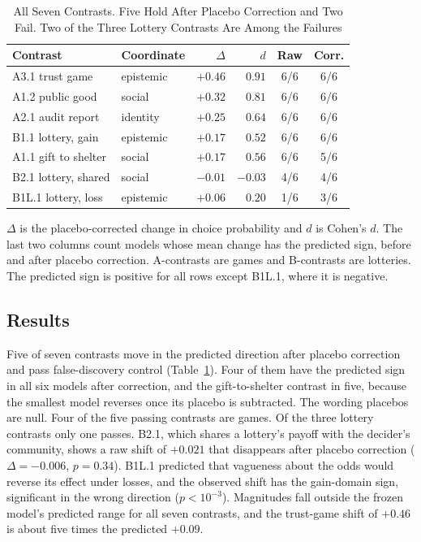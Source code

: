 \documentclass[journal]{IEEEtran}
\begin{document}
\begin{table}[!t]
\renewcommand{\arraystretch}{1.15}
\caption{All Seven Contrasts. Five Hold After Placebo Correction and Two Fail. Two of the Three Lottery Contrasts Are Among the Failures}
\label{tab:projgap}
\centering
\footnotesize
\begin{tabular}{@{}l l r r c c@{}}
\toprule
\textbf{Contrast} & \textbf{Coordinate} & \textbf{$\Delta$} & \textbf{$d$} & \textbf{Raw} & \textbf{Corr.} \\
\midrule
A3.1 trust game     & epistemic & $+0.46$ & $0.91$ & 6/6 & 6/6 \\
A1.2 public good    & social    & $+0.32$ & $0.81$ & 6/6 & 6/6 \\
A2.1 audit report   & identity  & $+0.25$ & $0.64$ & 6/6 & 6/6 \\
B1.1 lottery, gain  & epistemic & $+0.17$ & $0.52$ & 6/6 & 6/6 \\
A1.1 gift to shelter & social   & $+0.17$ & $0.56$ & 6/6 & 5/6 \\
\midrule
B2.1 lottery, shared & social   & $-0.01$ & $-0.03$ & 4/6 & 4/6 \\
B1L.1 lottery, loss & epistemic & $+0.06$ & $0.20$ & 1/6 & 3/6 \\
\bottomrule
\end{tabular}
\begin{flushleft}
\footnotesize{$\Delta$ is the placebo-corrected change in choice probability and $d$ is Cohen's $d$. The last two columns count models whose mean change has the predicted sign, before and after placebo correction. A-contrasts are games and B-contrasts are lotteries. The predicted sign is positive for all rows except B1L.1, where it is negative.}
\end{flushleft}
\end{table}

\subsection{Results}
Five of seven contrasts move in the predicted direction after placebo correction and pass false-discovery control (Table~\ref{tab:projgap}).
Four of them have the predicted sign in all six models after correction, and the gift-to-shelter contrast in five, because the smallest model reverses once its placebo is subtracted.
The wording placebos are null.
Four of the five passing contrasts are games.
Of the three lottery contrasts only one passes.
B2.1, which shares a lottery's payoff with the decider's community, shows a raw shift of $+0.021$ that disappears after placebo correction ($\Delta=-0.006$, $p=0.34$).
B1L.1 predicted that vagueness about the odds would reverse its effect under losses, and the observed shift has the gain-domain sign, significant in the wrong direction ($p<10^{-3}$).
Magnitudes fall outside the frozen model's predicted range for all seven contrasts, and the trust-game shift of $+0.46$ is about five times the predicted $+0.09$.
\end{document}
